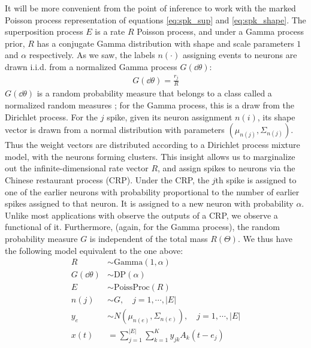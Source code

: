 
It will be more convenient from the point of inference to work with the marked Poisson process representation of equations \ref{eq:spk_sup} and \ref{eq:spk_shape}. 
The superposition process $E$ is a rate $R$ Poisson process,
and under a Gamma process prior, $R$ has a conjugate Gamma distribution with shape and scale parameters $1$ and $\alpha$ respectively.
As we saw, the labels $n(\cdot)$ assigning events to neurons are drawn i.i.d. from a normalized Gamma process $G(\dd \theta)$:
\begin{align}
 G(\dd \theta) = \frac{r_j}{R}
\end{align}
$G(\dd \theta)$ is a random probability measure that belongs to a class called a normalized random measures \citep{JamesLP09}; for the Gamma process, 
this is a draw from the Dirichlet process. For the $j$ spike, given its neuron assignment $n(i)$, its shape vector is drawn from a normal distribution
with parameters $(\mu_{n(j)}, \Sigma_{n(j)})$. Thus the weight vectors are distributed according to a Dirichlet process mixture model, with
the neurons forming clusters. This insight allows us to marginalize out the infinite-dimensional rate vector $R$, and assign spikes to neurons via
the Chinese restaurant process (CRP). Under the CRP, the $j$th spike is assigned to one of the earlier neurons with probability proportional to the number
of earlier spikes assigned to that neuron. It is assigned to a new neuron with probability $\alpha$.
Unlike most applications with observe the outputs of a CRP, we observe a functional of it.
Furthermore, (again, for the Gamma process), the random probability measure $G$ is independent of the total mass $R(\Theta)$. We thus have
 the following model equivalent to the one above:
\begin{align}
  R & \sim \text{Gamma}(1,\alpha) \\
  G(\dd \theta) & \sim \text{DP}(\alpha) \\
  E &\sim \text{PoissProc}(R) \\
  n(j) &\sim G, \quad j = 1,\cdots, |E| \\
  y_e &\sim N(\mu_{n(e)}, \Sigma_{n(e)}), \quad  j = 1,\cdots, |E| \\
  x(t) &=   \sum_{j=1}^{|E|} \sum_{k=1}^K y_{jk} A_k(t - e_{j})
\end{align}

